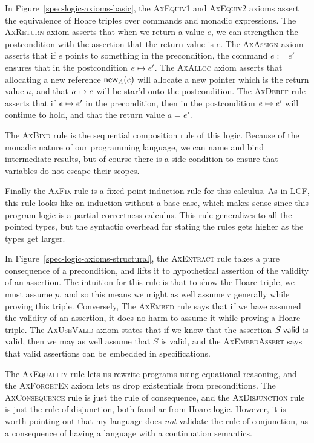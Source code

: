 In Figure~\ref{spec-logic-axioms-basic}, the \textsc{AxEquiv1} and
\textsc{AxEquiv2} axioms assert the equivalence of Hoare triples over
commands and monadic expressions.  The \textsc{AxReturn} axiom asserts
that when we return a value $e$, we can strengthen the postcondition
with the assertion that the return value is $e$. The \textsc{AxAssign}
axiom asserts that if $e$ points to something in the precondition, the
command $e := e'$ ensures that in the postcondition $e \mapsto
e'$. The \textsc{AxAlloc} axiom asserts that allocating a new
reference $\mathsf{new}_{A}(e)$ will allocate a new pointer which is the
return value $a$, and that $a \mapsto e$ will be star'd onto the
postcondition. The \textsc{AxDeref} rule asserts that if $e \mapsto
e'$ in the precondition, then in the postcondition $e \mapsto e'$
will continue to hold, and that the return value $a = e'$.

The \textsc{AxBind} rule is the sequential composition rule of this
logic.  Because of the monadic nature of our programming language, we
can name and bind intermediate results, but of course there is a side-condition
to ensure that variables do not escape their scopes. 

Finally the \textsc{AxFix} rule is a fixed point induction rule for
this calculus. As in LCF, this rule looks like an induction without a
base case, which makes sense since this program logic is a partial
correctness calculus. This rule generalizes to all the pointed types,
but the syntactic overhead for stating the rules gets higher as the
types get larger.

In Figure~\ref{spec-logic-axioms-structural}, the \textsc{AxExtract}
rule takes a pure consequence of a precondition, and lifts it to
hypothetical assertion of the validity of an assertion. The intuition
for this rule is that to show the Hoare triple, we must assume $p$,
and so this means we might as well assume $r$ generally while proving
this triple. Conversely, The \textsc{AxEmbed} rule says that if we
have assumed the validity of an assertion, it does no harm to assume
it while proving a Hoare triple. The \textsc{AxUseValid} axiom states
that if we know that the assertion ${S}\;\mathsf{valid}$ is valid, then we
may as well assume that $S$ is valid, and the \textsc{AxEmbedAssert}
says that valid assertions can be embedded in specifications. 

The \textsc{AxEquality} rule lets us rewrite programs using equational
reasoning, and the \textsc{AxForgetEx} axiom lets us drop existentials
from preconditions. The \textsc{AxConsequence} rule is just the rule
of consequence, and the \textsc{AxDisjunction} rule is just the rule
of disjunction, both familiar from Hoare logic. However, it is worth
pointing out that my language does \emph{not} validate the rule of
conjunction, as a consequence of having a language with a continuation
semantics.

